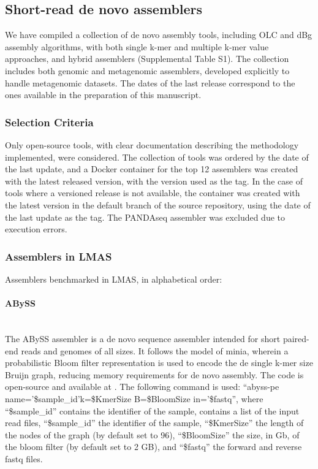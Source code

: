 \subsection{Short-read de novo assemblers}

We have compiled a collection of de novo assembly tools, including \ac{OLC} and \ac{dBg} assembly algorithms, with both single k-mer and multiple k-mer value approaches, and hybrid assemblers (Supplemental Table S1). The collection includes both genomic and metagenomic assemblers, developed explicitly to handle metagenomic datasets. The dates of the last release correspond to the ones available in the preparation of this manuscript.

\subsubsection{Selection Criteria}

Only open-source tools, with clear documentation describing the methodology implemented, were considered. The collection of tools was ordered by the date of the last update, and a Docker container \cite{noauthor_docker_nodate} for the top 12 assemblers was created with the latest released version, with the version used as the tag. In the case of tools where a versioned release is not available, the container was created with the latest version in the default branch of the source repository, using the date of the last update as the tag. The PANDAseq \cite{masella_pandaseq_2012} assembler was excluded due to execution errors. 

\subsubsection{Assemblers in LMAS}

Assemblers benchmarked in LMAS, in alphabetical order:

\paragraph{ABySS} \mbox{}\\

The ABySS assembler \cite{jackman_abyss_2017} is a de novo sequence assembler intended for short paired-end reads and genomes of all sizes. It follows the model of minia, wherein a probabilistic Bloom filter representation is used to encode the de single k-mer size Bruijn graph, reducing memory requirements for de novo assembly. The code is open-source and available at \cite{noauthor_abyss_2022}. The following command is used: “abyss-pe name='\$sample\_id'k=\$KmerSize B=\$BloomSize in='\$fastq”, where “\$sample\_id” contains the identifier of the sample,  contains a list of the input read files, “\$sample\_id” the identifier of the sample, “\$KmerSize” the length of the nodes of the graph (by default set to 96), “\$BloomSize” the size, in Gb, of the bloom filter (by default set to 2 GB), and “\$fastq” the forward and reverse fastq files. 

